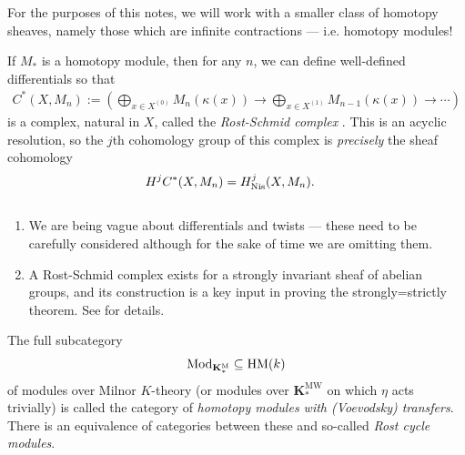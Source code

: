 \documentclass[11pt,openany]{book}
\providecommand{\HM}{\mathrm{HM}}
\providecommand{\KM}{\mathbf{K}^\mathrm{M}}
\providecommand{\KMW}{\mathbf{K}^\mathrm{MW}}
\begin{document}
For the purposes of this notes, we will work with a smaller class of homotopy sheaves, namely those which are infinite contractions --- i.e. homotopy modules!

\begin{theorem} If $M_\ast$ is a homotopy module, then for any $n$, we can define well-defined differentials so that
\begin{align*}
    C^\ast(X,M_n) := \left( \bigoplus_{x\in X^{(0)}} M_n(\kappa(x)) \to \bigoplus_{x\in X^{(1)}} M_{n-1}(\kappa(x)) \to \cdots \right)
\end{align*}
is a complex, natural in $X$, called the \textit{Rost-Schmid complex} \cite[5.31]{Morel}. This is an acyclic resolution, so the $j$th cohomology group of this complex is \textit{precisely} the sheaf cohomology
\begin{align*}
    H^j C^\ast(X,M_n) &= H^j_{\mathrm{Nis}}(X, M_n).
\end{align*}
\end{theorem}


\begin{remark} $\ $
\begin{enumerate}
    \item We are being vague about differentials and twists --- these need to be carefully considered although for the sake of time we are omitting them.
    \item A Rost-Schmid complex exists for a strongly invariant sheaf of abelian groups, and its construction is a key input in proving the strongly=strictly theorem. See \cite[\S6]{bachmannstrongly} for details.
\end{enumerate}
\end{remark}

\begin{definition} The full subcategory
\begin{align*}
    \Mod_{\KM_\ast} \subseteq \HM(k)
\end{align*}
of modules over Milnor $K$-theory (or modules over $\KMW_\ast$ on which $\eta$ acts trivially) is called the category of \textit{homotopy modules with (Voevodsky) transfers}. There is an equivalence of categories between these and so-called \textit{Rost cycle modules}.
\end{definition}
\end{document}
